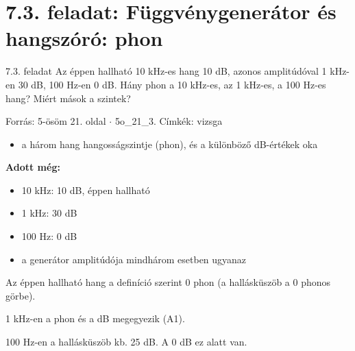 \section{\texorpdfstring{7.3. feladat: Függvénygenerátor és hangszóró: phon}{7.3. feladat: Függvénygenerátor és hangszóró: phon}}\label{o7_03}
\setcounter{lepes}{0}
\begin{feladat}{7.3. feladat}
Az éppen hallható 10 kHz-es hang 10 dB, azonos amplitúdóval 1 kHz-en 30 dB, 100 Hz-en 0 dB. Hány phon a 10 kHz-es, az 1 kHz-es, a 100 Hz-es hang? Miért mások a szintek?

{\footnotesize\sffamily Forrás: 5-ösöm 21. oldal $\cdot$ 5o\_21\_3. Címkék: vizsga}
\end{feladat}
\begin{keresunk}
\begin{itemize}
\item a három hang hangosságszintje (phon), és a különböző dB-értékek oka
\end{itemize}
\end{keresunk}
\begin{jeloles}
\par\smallskip\textbf{Adott még:}
\begin{itemize}
\item 10 kHz: 10 dB, éppen hallható
\item 1 kHz: 30 dB
\item 100 Hz: 0 dB
\item a generátor amplitúdója mindhárom esetben ugyanaz
\end{itemize}
\end{jeloles}

Az éppen hallható hang a definíció szerint 0 phon (a hallásküszöb a 0 phonos görbe).

\begin{center}\end{center}

1 kHz-en a phon és a dB megegyezik (A1).

\begin{center}\end{center}

100 Hz-en a hallásküszöb kb. 25 dB. A 0 dB ez alatt van.

